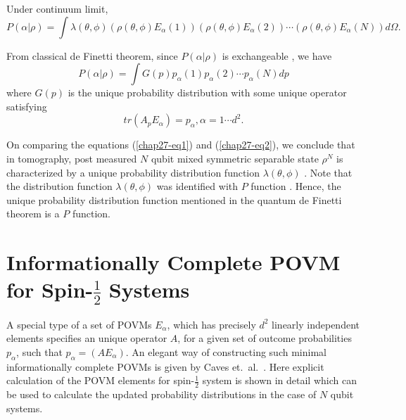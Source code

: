 Under continuum limit,
\makeatletter
{}
\makeatother
\begin{equation} 
P(\alpha|\rho) = \int \lambda(\theta,\phi) (\rho(\theta,\phi) E_{\alpha}(1)) (\rho (\theta,\phi) E_{\alpha}(2)) \cdots (\rho (\theta,\phi) E_{\alpha}(N)) d\Omega. \label{chap27-eq1}
\end{equation}

From classical de Finetti theorem, since $P(\alpha|\rho)$ is exchangeable \cite{chap27-key10}, we have 
\begin{equation} 
P(\alpha|\rho) = \int G(p) p_{\alpha}(1) p_{\alpha}(2) \cdots p_{\alpha}(N) dp \label{chap27-eq2}
\end{equation} 
where $G(p)$ is the unique probability distribution with some unique operator satisfying 
$$
tr(A_{p}E_{\alpha}) = p_{\alpha}, \alpha= 1 \cdots d^{2}.
$$

On comparing the equations (\eqref{chap27-eq1}) and (\eqref{chap27-eq2}), we conclude that in tomography, post measured $N$ qubit mixed symmetric separable state $\rho^{N}$ is characterized by a unique probability distribution function $\lambda(\theta,\phi)$ \cite{chap27-key11}. Note that the distribution function $\lambda(\theta,\phi)$ was identified with $P$ function \cite{chap27-key12}. Hence, the unique probability distribution function mentioned in the quantum de Finetti theorem is a $P$ function.

\section{Informationally Complete POVM for Spin-$\frac{1}{2}$ Systems}\label{chap27-sec6}

A special type of a set of POVMs \cite{chap27-key8} $E_{\alpha}$, which has precisely $d^{2}$ linearly independent elements specifies an unique operator $A$, for a given set of outcome probabilities $p_{\alpha}$, such that $p_{\alpha}= (AE_{\alpha})$. An elegant way of constructing such minimal informationally complete POVMs is given by Caves et.\ al.\ \cite{chap27-key8}. Here explicit calculation of the POVM elements for spin-$\frac{1}{2}$ system is shown in detail which can be used to calculate the updated probability distributions in the case of $N$ qubit systems.

